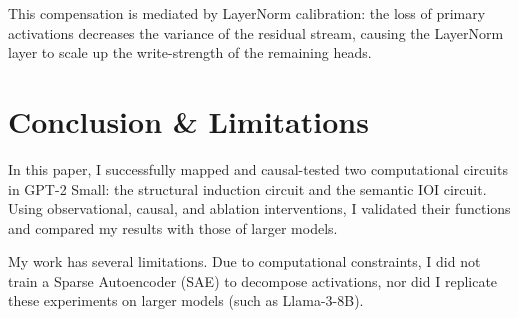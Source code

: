\documentclass[11pt]{article}
\begin{document}
This compensation is mediated by LayerNorm calibration: the loss of primary activations decreases the variance of the residual stream, causing the LayerNorm layer to scale up the write-strength of the remaining heads.
\section{Conclusion \& Limitations}

In this paper, I successfully mapped and causal-tested two computational circuits in GPT-2 Small: the structural induction circuit and the semantic IOI circuit. Using observational, causal, and ablation interventions, I validated their functions and compared my results with those of larger models.

My work has several limitations. Due to computational constraints, I did not train a Sparse Autoencoder (SAE) to decompose activations, nor did I replicate these experiments on larger models (such as Llama-3-8B).


\end{document}
